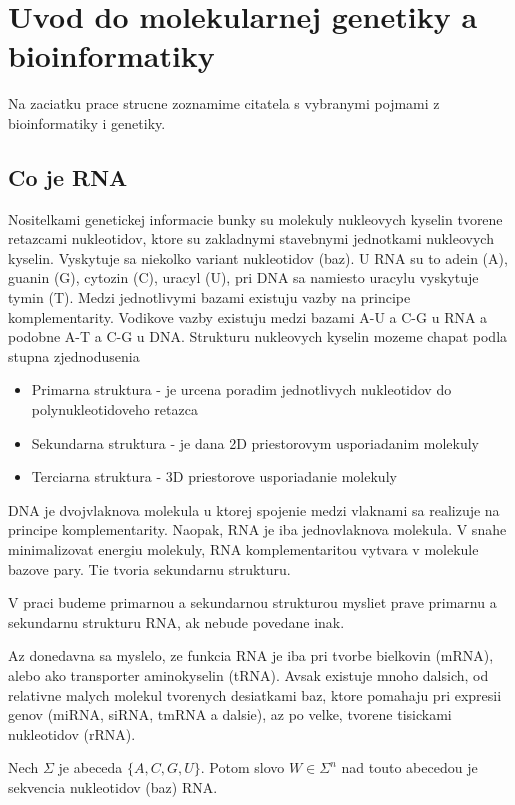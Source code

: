 \renewcommand{\SS}{\mathbb{S}}
\newcommand{\Par}[2]{\mbox{$( #1, #2 )$}}

\chapter{Uvod do molekularnej genetiky a bioinformatiky}

Na zaciatku prace strucne zoznamime citatela s vybranymi pojmami
z bioinformatiky i genetiky.

\section{Co je RNA}

Nositelkami genetickej informacie bunky su molekuly nukleovych kyselin
tvorene retazcami nukleotidov, ktore su zakladnymi stavebnymi jednotkami
nukleovych kyselin. Vyskytuje sa niekolko variant nukleotidov (baz). U RNA su to
adein (A), guanin (G), cytozin (C), uracyl (U),
pri DNA sa namiesto uracylu vyskytuje tymin (T).
Medzi jednotlivymi bazami existuju vazby na principe komplementarity.
Vodikove vazby existuju medzi bazami A-U a C-G u RNA a podobne A-T a C-G u DNA.
Strukturu nukleovych kyselin mozeme chapat podla stupna zjednodusenia
\begin{itemize}
	\item Primarna struktura - je urcena poradim jednotlivych nukleotidov
		do polynukleotidoveho retazca
	\item Sekundarna struktura - je dana 2D priestorovym usporiadanim molekuly
	\item Terciarna struktura - 3D priestorove usporiadanie molekuly
\end{itemize}
DNA je dvojvlaknova molekula u ktorej spojenie medzi vlaknami sa realizuje na principe
komplementarity.
Naopak, RNA je iba jednovlaknova molekula. V snahe minimalizovat energiu molekuly,
RNA komplementaritou vytvara v molekule bazove pary. Tie tvoria sekundarnu strukturu.

V praci budeme primarnou a sekundarnou strukturou mysliet prave primarnu a sekundarnu
strukturu RNA, ak nebude povedane inak.

Az donedavna sa myslelo, ze funkcia RNA je iba pri tvorbe bielkovin (mRNA), alebo
ako transporter aminokyselin (tRNA). Avsak existuje mnoho dalsich, od relativne
malych molekul tvorenych desiatkami baz, ktore pomahaju pri expresii genov
(miRNA, siRNA, tmRNA a dalsie), az po velke, tvorene tisickami nukleotidov (rRNA).

\begin{definice}\label{def:RNA_primarna_struktura}
	Nech $\Sigma$ je abeceda $\{A, C, G, U\}$. Potom slovo $W \in \Sigma^n$ nad touto abecedou
	je sekvencia nukleotidov (baz) RNA.
\end{definice}

